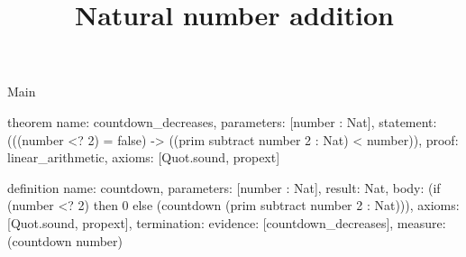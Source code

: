 \begin{lexlean}{Main}
\title{Natural number addition}
\begin{semanticmodule}
theorem{
  name: countdown_decreases,
  parameters: [number : Nat],
  statement: (((number <? 2) = false) -> ((prim subtract number 2 : Nat) < number)),
  proof: linear_arithmetic{},
  axioms: [Quot.sound, propext]
}

definition{
  name: countdown,
  parameters: [number : Nat],
  result: Nat,
  body: (if (number <? 2) then 0 else (countdown (prim subtract number 2 : Nat))),
  axioms: [Quot.sound, propext],
  termination: {evidence: [countdown_decreases], measure: (countdown number)}
}
\end{semanticmodule}
\end{lexlean}
